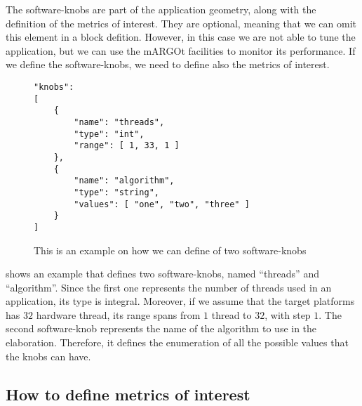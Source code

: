 The software-knobs are part of the application geometry, along with the definition of the metrics of interest.
They are optional, meaning that we can omit this element in a block defition.
However, in this case we are not able to tune the application, but we can use the mARGOt facilities to monitor its performance.
If we define the software-knobs, we need to define also the metrics of interest.


\begin{figure}
\lstset{language=json}
\begin{lstlisting}
"knobs":
[
	{
		"name": "threads",
		"type": "int",
		"range": [ 1, 33, 1 ]
	},
	{
		"name": "algorithm",
		"type": "string",
		"values": [ "one", "two", "three" ]
	}
]
\end{lstlisting}
\caption{This is an example on how we can define of two software-knobs}
\label{code:knobs}
\end{figure}

 shows an example that defines two software-knobs, named ``threads'' and ``algorithm''.
Since the first one represents the number of threads used in an application, its type is integral.
Moreover, if we assume that the target platforms has $32$ hardware thread, its range spans from $1$ thread to $32$, with step $1$.
The second software-knob represents the name of the algorithm to use in the elaboration.
Therefore, it defines the enumeration of all the possible values that the knobs can have.



\subsection{How to define metrics of interest}
\label{ssec:metric_element}


